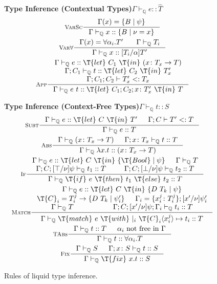 \documentclass[10pt,preprint]{sigplanconf-pldi16}
\theoremstyle{definition}
\newcommand{\Subt}{<:}
\newcommand{\App}[2]{{#1}\ {#2}}
\newcommand{\env}{\Gamma}
\newcommand{\funT}[3]{{#1}\colon {#2} \to {#3}}
\newcommand{\contT}[2]{\T{let}\ {#1}\ \T{in}\ {#2}}
\newcommand{\quals}{\mathbb{Q}}
\newcommand{\entailsQ}{\vdash_{\quals}}
\begin{document}
\begin{figure}
\small
\textbf{Type Inference (Contextual Types)}\quad$\boxed{\env \entailsQ e :: \hat{T}}$
\begin{gather*}
\inference[\textsc{VarSc}]
{\env(x) =\{B \mid \psi\}}
{\env \entailsQ x :: \{B\mid\nu = x\} }
\\
\inference[\textsc{Var$\forall$}]
{\env(x)=\forall\alpha_i.T'\ &  \env \entailsQ T_i}
{\env \entailsQ x :: [T_i/\alpha]T'}
\\
\inference[\textsc{App}]
{\env \entailsQ e :: \contT{C_1}{(\funT{x}{T_x}{T})}    \\  
\env;C_1 \entailsQ t :: \contT{C_2}{T_x'} \\
\env;C_1;C_2 \vdash T_x' \Subt T_x}
{\env \entailsQ \App{e}{t} :: \contT{C_1;C_2;x\colon T_x'}{T} }
\end{gather*}

\textbf{Type Inference (Context-Free Types)}\quad$\boxed{\env \entailsQ t :: S}$
\begin{gather*}
\inference[\textsc{Subt}]
{\env\entailsQ e :: \contT{C}{T'} & \env;C \vdash T' \Subt T}
{\env \entailsQ e :: T}
\\
\inference[\textsc{Abs}]
{\env\entailsQ(\funT{x}{T_x}{T}) &  \env;x\colon T_x \entailsQ t :: T}
{\env \entailsQ \lambda x.t :: (\funT{x}{T_x}{T})}
\\
\inference[\textsc{If}]
{\env \entailsQ e :: \contT{C}{\{\T{Bool}\mid \psi\}} & \env\entailsQ T \\
\env;C;[\top/\nu]\psi \entailsQ t_1 :: T  &  
\env;C;[\bot/\nu]\psi \entailsQ t_2 :: T}
{\env \entailsQ\T{if}\ e\ \T{then}\ t_1\ \T{else}\ t_2 :: T}
\\
\inference[\textsc{Match}]
{\env \entailsQ e :: \contT{C}{\{D\ T_k\mid\psi\}}  \\
\T{C}_i = T_i^j \to \{D\ T_k\mid\psi'_i\}    &
\env_i = \{x_i^j\colon T_i^j\};[x'/\nu]\psi'_i \\
\env\entailsQ T & \env;C;[x'/\nu]\psi;\env_i \entailsQ t_i :: T}
{\env \entailsQ \T{match}\ e\ \T{with}\ |_i\ \T{C}_i \langle x_i^j\rangle \mapsto t_i :: T}
\\
\inference[\textsc{TAbs}]
{\env \entailsQ t :: T  &  \alpha_i\ \text{not free in}\ \env}
{\env \entailsQ t :: \forall\alpha_i.T}
\\
\inference[\textsc{Fix}]
{\env\entailsQ S & \env;x\colon S \entailsQ t :: S}
{\env \entailsQ \T{fix}\ x.t :: S}
\end{gather*}
\caption{Rules of liquid type inference.}\label{fig:bottom-up}
\end{figure}
\end{document}
